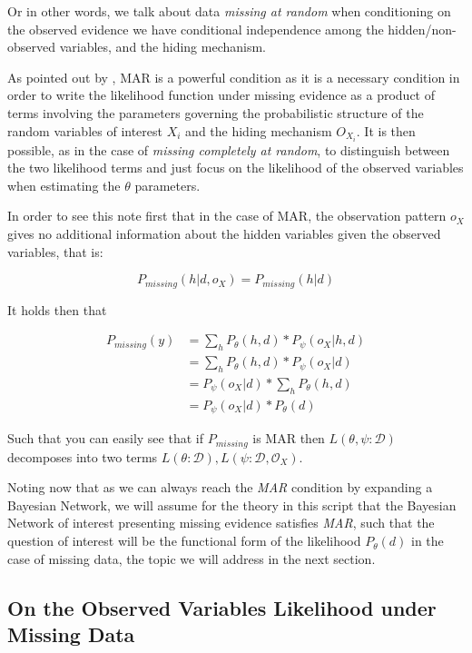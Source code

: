 \documentclass[11pt]{article}
\begin{document}
\begin{article}
Or in other words, we talk about data \emph{missing at random} when
conditioning on the observed evidence we have conditional
independence among the hidden/non-observed variables, and the
hiding mechanism.

As pointed out by \cite{koller2009probabilistic}, MAR is a powerful
condition as it is a necessary condition in order to write the
likelihood function under missing evidence as a product of terms
involving the parameters governing the probabilistic structure of
the random variables of interest \(X_i\) and the hiding mechanism
\(O_{X_i}\). It is then possible, as in the case of \emph{missing
completely at random}, to distinguish between the two likelihood
terms and just focus on the likelihood of the observed variables
when estimating the \(\theta\) parameters.

In order to see this note first that in the case of MAR, the
observation pattern \(o_X\) gives no additional information about the
hidden variables given the observed variables, that is:

$$ P_{missing} (h | d, o_{X}) =  P_{missing} (h | d) $$

It holds then that 


\begin{align}
P_{missing}(y) &= \sum_h P_{\theta} (h, d) * P_\psi(o_{X} | h, d) \nonumber \\
             &= \sum_h P_{\theta} (h, d) * P_\psi(o_{X} | d) \nonumber \\
             &= P_\psi(o_{X} | d) * \sum_h P_{\theta} (h, d)  \nonumber \\
	     &= P_\psi(o_{X} | d) * P_{\theta} (d)  \nonumber		
\end{align}

Such that you can easily see that if \(P_{missing}\) is MAR then
\(L(\theta, \psi : \mathcal{D})\) decomposes into two terms \(L(\theta :
   \mathcal{D}), L(\psi : \mathcal{D}, \mathcal{O}_X)\).

Noting now that as we can always reach the \emph{MAR} condition by
expanding a Bayesian Network, we will assume for the theory in this
script that the Bayesian Network of interest presenting missing
evidence satisfies \emph{MAR}, such that the question of interest will
be the functional form of the likelihood \(P_{\theta} (d)\) in the
case of missing data, the topic we will address in the next
section.

\subsection{On the Observed Variables Likelihood under Missing Data}
\label{sec:org232f58e}


\end{article}
\end{document}
